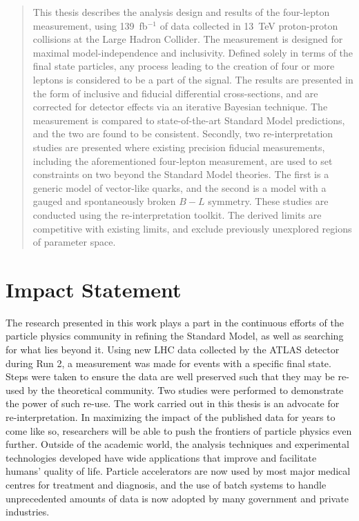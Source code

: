
\begin{abstract}%
  This thesis describes the analysis design and results of the \ATLAS four-lepton measurement, using 139~fb$^{-1}$ of data collected in 13~TeV proton-proton collisions at the Large Hadron Collider. The measurement is designed for maximal model-independence and inclusivity. Defined solely in terms of the final state particles, any process leading to the creation of four or more leptons is considered to be a part of the signal. The results are presented in the form of inclusive and fiducial differential cross-sections, and are corrected for detector effects via an iterative Bayesian technique. The measurement is compared to state-of-the-art Standard Model predictions, and the two are found to be consistent. Secondly, two re-interpretation studies are presented where existing precision fiducial measurements, including the aforementioned four-lepton measurement, are used to set constraints on two beyond the Standard Model theories. The first is a generic model of vector-like quarks, and the second is a model with a gauged and spontaneously broken $B-L$ symmetry. These studies are conducted using the \contur re-interpretation toolkit. The derived limits are competitive with existing \ATLAS limits, and exclude previously unexplored regions of parameter space. 
\end{abstract}

\chapter*{\centering Impact Statement}
The research presented in this work plays a part in the continuous efforts of the particle physics community in refining the Standard Model, as well as searching for what lies beyond it. Using new LHC data collected by the ATLAS detector during Run 2, a measurement was made for events with a specific final state. Steps were taken to ensure the data are well preserved such that they may be re-used by the theoretical community. Two studies were performed to demonstrate the power of such re-use. The work carried out in this thesis is an advocate for re-interpretation. In maximizing the impact of the published data for years to come like so, researchers will be able to push the frontiers of particle physics even further. Outside of the academic world, the analysis techniques and experimental technologies developed have wide applications that improve and facilitate humans' quality of life. Particle accelerators are now used by most major medical centres for treatment and diagnosis, and the use of batch systems to handle unprecedented amounts of data is now adopted by many government and private industries. 


